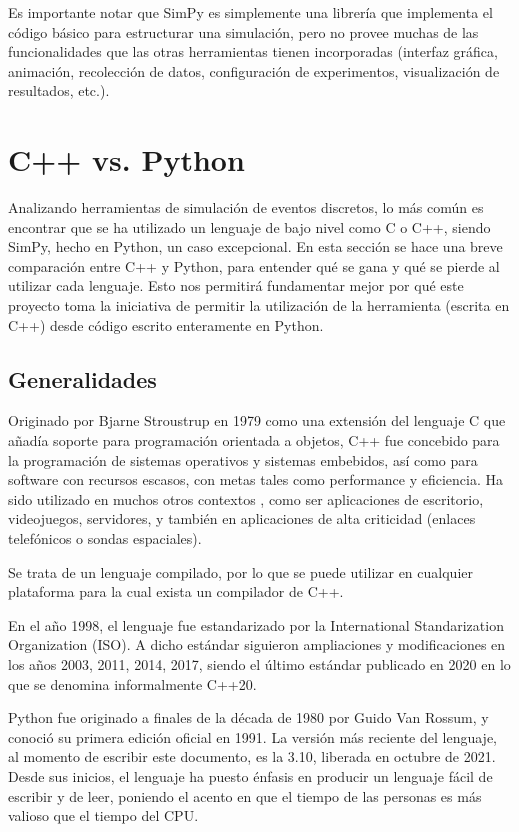 Es importante notar que SimPy es simplemente una librería que implementa el
código básico para estructurar una simulación, pero no provee muchas de las
funcionalidades que las otras herramientas tienen incorporadas (interfaz
gráfica, animación, recolección de datos, configuración de experimentos,
visualización de resultados, etc.).

\section{C++ vs. Python}

Analizando herramientas de simulación de eventos discretos, lo más común es
encontrar que se ha utilizado un lenguaje de bajo nivel como C o C++, siendo
SimPy, hecho en Python, un caso excepcional. En esta sección se hace una breve
comparación entre C++ y Python, para entender qué se gana y qué se pierde al
utilizar cada lenguaje. Esto nos permitirá fundamentar mejor por qué este
proyecto toma la iniciativa de permitir la utilización de la herramienta
\omnetpp{} (escrita en C++) desde código escrito enteramente en Python.

\subsection{Generalidades}

Originado por Bjarne Stroustrup en 1979 como una extensión del lenguaje C que
añadía soporte para programación orientada a objetos, C++ fue concebido para la
programación de sistemas operativos y sistemas embebidos, así como para
software con recursos escasos, con metas tales como performance y eficiencia.
Ha sido utilizado en muchos otros contextos \cite{stroustrup}, como ser
aplicaciones de escritorio, videojuegos, servidores, y también en aplicaciones
de alta criticidad (enlaces telefónicos o sondas espaciales).

Se trata de un lenguaje compilado, por lo que se puede utilizar en cualquier
plataforma para la cual exista un compilador de C++.

En el año 1998, el lenguaje fue estandarizado por la International
Standarization Organization (ISO). A dicho estándar siguieron ampliaciones y
modificaciones en los años 2003, 2011, 2014, 2017, siendo el último estándar
publicado en 2020 en lo que se denomina informalmente C++20.

Python fue originado a finales de la década de 1980 por Guido Van Rossum, y
conoció su primera edición oficial en 1991. La versión más reciente del
lenguaje, al momento de escribir este documento, es la 3.10, liberada en
octubre de 2021. Desde sus inicios, el lenguaje ha puesto énfasis en producir
un lenguaje fácil de escribir y de leer, poniendo el acento en que el tiempo de
las personas es más valioso que el tiempo del CPU.

